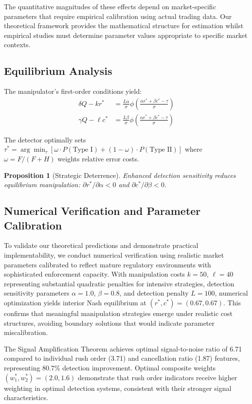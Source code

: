 \documentclass[12pt]{article}
\newtheorem{proposition}[theorem]{Proposition}
\begin{document}
The quantitative magnitudes of these effects depend on market-specific parameters that require empirical calibration using actual trading data. Our theoretical framework provides the mathematical structure for estimation whilst empirical studies must determine parameter values appropriate to specific market contexts.

\subsection{Equilibrium Analysis}

The manipulator's first-order conditions yield:
\begin{align}
\delta Q - kr^* &= \frac{L\alpha}{\sigma} \phi\left(\frac{\alpha r^* + \beta c^* - \tau}{\sigma}\right) \\
\gamma Q - \ell c^* &= \frac{L\beta}{\sigma} \phi\left(\frac{\alpha r^* + \beta c^* - \tau}{\sigma}\right)
\end{align}

The detector optimally sets $\tau^* = \arg\min_\tau [\omega \cdot P(\text{Type I}) + (1-\omega) \cdot P(\text{Type II})]$ where $\omega = F/(F+H)$ weights relative error costs.

\begin{proposition}[Strategic Deterrence]
Enhanced detection sensitivity reduces equilibrium manipulation: $\partial r^*/\partial \alpha < 0$ and $\partial c^*/\partial \beta < 0$.
\end{proposition}

\subsection{Numerical Verification and Parameter Calibration}

To validate our theoretical predictions and demonstrate practical implementability, we conduct numerical verification using realistic market parameters calibrated to reflect mature regulatory environments with sophisticated enforcement capacity. With manipulation costs $k=50$, $\ell=40$ representing substantial quadratic penalties for intensive strategies, detection sensitivity parameters $\alpha=1.0$, $\beta=0.8$, and detection penalty $L=100$, numerical optimization yields interior Nash equilibrium at $(r^*, c^*) = (0.67, 0.67)$. This confirms that meaningful manipulation strategies emerge under realistic cost structures, avoiding boundary solutions that would indicate parameter miscalibration.

The Signal Amplification Theorem achieves optimal signal-to-noise ratio of 6.71 compared to individual rush order (3.71) and cancellation ratio (1.87) features, representing 80.7\% detection improvement. Optimal composite weights $(w_1^*, w_2^*) = (2.0, 1.6)$ demonstrate that rush order indicators receive higher weighting in optimal detection systems, consistent with their stronger signal characteristics.
\end{document}
